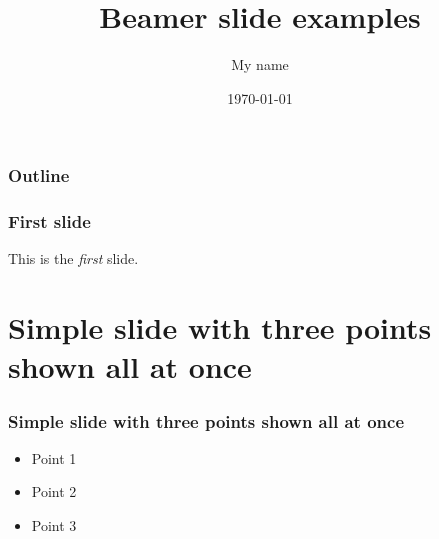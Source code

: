 \documentclass[blue]{beamer}
\title{Beamer slide examples}
\author{My name}
\institute{George Mason University}
\date{\today}
\begin{document}
\begin{frame}
  \titlepage
\end{frame}

\begin{frame}
	\frametitle{Outline}
		\tableofcontents[part=1, pausesections]
\end{frame}


\begin{frame}[c]
	\frametitle{First slide}
	 	This is the \textit{first} slide.
\end{frame}

\section[Outline]{}




\section{Simple slide with three points shown all at once}

\begin{frame}
  \frametitle{Simple slide with three points shown all at once}   %

  \begin{itemize}
  \item Point 1
  \item Point 2
  \item Point 3
  \end{itemize}
\end{frame}
\end{document}
